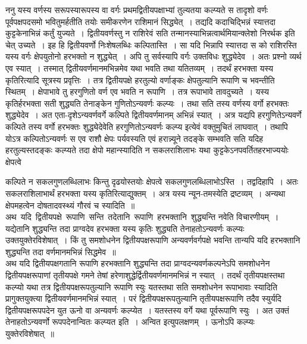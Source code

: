 \documentclass[11pt, openany]{book}
\begin{document}
\vspace{-3mm}
 ननु यस्य वर्णस्य सरूपस्यारूपस्य वा वर्गः प्रथमद्वितीयपक्षाभ्यां 
तुल्यतया कल्प्यते स तादृशो वर्णः पूर्वपक्षपदसमो भवितुमर्हतीति तयोः
समीकरणेन राशिमानं सिद्ध्येत्~। तद्यदि कदाचिद्भिन्नं स्यात्तदा कुट्टकेनाभिन्नं 
कर्तुं युज्यते~। द्वितीयवर्णस्तु न राशिरेवं सति तन्मानस्याभिन्नत्वार्थमियान्क्लेशो 
निरर्थक इति चेत् उच्यते~। इह हि द्वितीयवर्णो निःशेषलब्धिः 
कल्पितास्ति~। सा यदि भिन्नापि स्यात्तदा स को राशिरस्ति यस्य वर्गः 
क्षेपयुतोनो हरभक्तो न शुद्ध्येत्~। अपि तु सर्वस्यापि वर्गः उक्तविधः
शुद्ध्येदेव~। अतः प्रश्नो व्यर्थ एव स्यात्~। तस्मात् द्वितीयवर्णमानमभिन्नमेव यथा भवति तथा यतितव्यम्~। तदर्थं हरभक्ता यस्य कृतिरित्यादि सूत्रस्य प्रवृत्तिः~। तत्र द्वितीयपक्षे हरतुल्यो वर्णाङ्कः क्षेपतुल्यानि रूपाणि च भवन्तीति स्थितम्~। क्षेपाभावे तु हरगुणितो वर्ण एव भवति न 
रूपाणि~। तत्र रूपाभावे तावदुच्यते~। यस्य कृतिर्हरभक्ता सती शुद्ध्यति
तेनाङ्केन गुणितोऽन्यवर्णः कल्प्यः~। तथा सति तस्य वर्णस्य वर्गो 
हरभक्तः शुद्ध्येदेव~। अत एता-दृशेऽन्यवर्णवर्गे कल्पिते द्वितीयवर्णमानम् अभिन्नं 
स्यात्~। अत्र यद्यपि हरगुणितेऽन्यवर्णे कल्पिते तस्य वर्गो हरभक्तः 
शुद्ध्येदेवेति हरगुणितोऽन्यवर्णः कल्प्य इत्येवं वक्तुमुचितं लाघवात्~। तथापि 
योऽत्र कल्पितोऽन्यवर्णः स एव राशौ क्षेपः पर्यवस्यति एवं हरान्न्यूने 
तदङ्के सम्भवति सति यदिह हरतुल्यस्तदङ्कः कल्प्यते तदा क्षेपो 
महान्स्यादिति न सकलराशिलाभः यथा कुट्टकेऽनपवर्तितहरभाज्ययोः क्षेपत्वे
\newpage

\noindent कल्पिते न सकलगुणलब्धिलाभः किन्तु दृढयोस्तयोः क्षेपत्वे सकलगुणलब्धिलाभोऽस्ति~। तद्वदिहापि~। अतः सकलराशिलाभार्थं हरभक्ता यस्य
कृतिरित्याद्युक्तम्~। अत्र यस्य न्यून-तमस्येति द्रष्टव्यम्~। अन्यथा क्षेपमहत्वेन 
दोषतादवस्थ्यं गौरवं च स्यादिति~॥ \\

\vspace{-3mm}
 अथ \,यदि \,द्वितीयपक्षे \,रूपाणि \,सन्ति \,तदेतानि \,रूपाणि \,हरभक्तानि \,शुद्ध्यन्ति नवेति विचारणीयम्~। यद्येतानि शुद्ध्यन्ति तदा प्राग्वदेव
हरभक्ता यस्य कृतिः शुद्ध्यति तेनाहतोऽन्यवर्णः कल्प्यः उक्तयुक्तेरविशेषात्~। 
किं तु समशोधनेन द्वितीयपक्षरूपाणि अन्यवर्णवर्गपक्षे भवन्ति तान्यपि यदि
हरभक्तानि शुद्ध्यन्ति तदा वर्णमानमभिन्नं सिद्धमेव~॥ \\

\vspace{-3mm}
 अथ यदि द्वितीयपक्षगतानि रूपाणि हरभक्तानि शुद्ध्यन्ति तदा
प्राग्वदन्यवर्णकल्पनेऽपि समशोधनेन द्वितीयपक्षरूपाणां तृतीयपक्षे गमने तेषां
हरेणाशुद्धेर्द्वितीयवर्णमानमभिन्नं न स्यात्~। तदर्थं तृतीयपक्षस्तथा कल्प्यो यथा
तत्र द्वितीयपक्षरूपतुल्यानि रूपाणि स्युः यतस्तथा सति समशोधनेन रूपाभावाः
स्यादिति प्रागुक्तयुक्त्या द्वितीयवर्णमानमभिन्नं स्यात्~। परं
द्वितीयपक्षरूपतुल्यानि तृतीयपक्षरूपाणि तदैव स्युर्यदि द्वितीयपक्षरूपपदेन युत ऊनो वा
अन्यवर्णः कल्प्येत~। यतस्तस्य वर्गे यथा पूर्वरूपाणि स्युः~। अत उक्तं तेनाहतोऽन्यवर्णो रूपपदेनान्वितः कल्प्यत इति~। अन्वित इत्युपलक्षणम्~। 
ऊनोऽपि कल्प्यः युक्तेरविशेषात्~॥ \\
\end{document}
